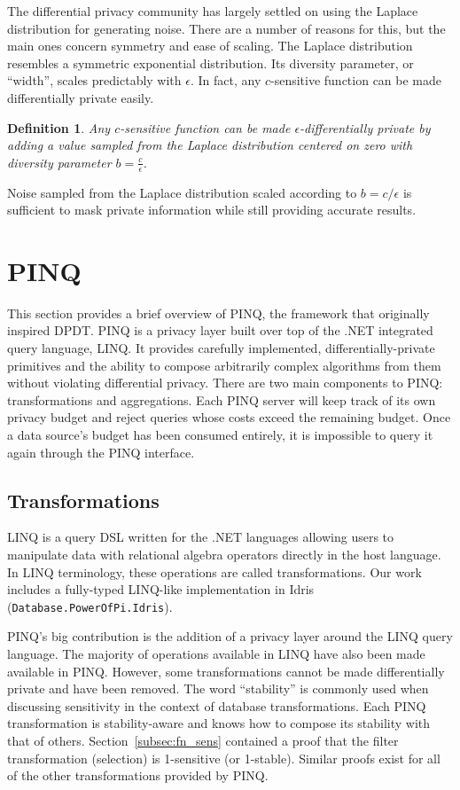 \documentclass[12pt]{report}
\newtheorem{defn}{Definition}[section]
\begin{document}
The differential privacy community has largely settled on using the Laplace distribution for generating noise.
There are a number of reasons for this, but the main ones concern symmetry and ease of scaling.
The Laplace distribution resembles a symmetric exponential distribution.
Its diversity parameter, or ``width'', scales predictably with $\epsilon$.
In fact, any $c$-sensitive function can be made differentially private easily.

\begin{defn}
Any $c$-sensitive function can be made $\epsilon$-differentially private by adding a value sampled from the Laplace distribution centered on zero with diversity parameter $b=\frac{c}{\epsilon}$.
\end{defn}

Noise sampled from the Laplace distribution scaled according to $b=c/\epsilon$ is sufficient to mask private information while still providing accurate results.

\section{PINQ}\label{sec:pinq}

This section provides a brief overview of PINQ, the framework that originally inspired DPDT.
PINQ is a privacy layer built over top of the .NET integrated query language, LINQ.
It provides carefully implemented, differentially-private primitives and the ability to compose arbitrarily complex algorithms from them without violating differential privacy.
There are two main components to PINQ: transformations and aggregations.
Each PINQ server will keep track of its own privacy budget and reject queries whose costs exceed the remaining budget.
Once a data source's budget has been consumed entirely, it is impossible to query it again through the PINQ interface.

\subsection{Transformations}

LINQ is a query DSL written for the .NET languages allowing users to manipulate data with relational algebra operators directly in the host language.
In LINQ terminology, these operations are called transformations.
Our work includes a fully-typed LINQ-like implementation in Idris (\texttt{Database.PowerOfPi.Idris}).

PINQ's big contribution is the addition of a privacy layer around the LINQ query language.
The majority of operations available in LINQ have also been made available in PINQ.
However, some transformations cannot be made differentially private and have been removed.
The word ``stability'' is commonly used when discussing sensitivity in the context of database transformations.
Each PINQ transformation is stability-aware and knows how to compose its stability with that of others.
Section~\ref{subsec:fn_sens} contained a proof that the filter transformation (selection) is 1-sensitive (or 1-stable).
Similar proofs exist for all of the other transformations provided by PINQ\cite{conf/sigmod/McSherry09}.
\end{document}
